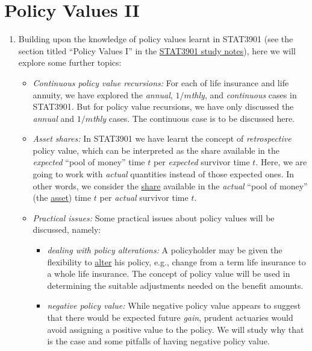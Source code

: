 \section{Policy Values II}
\label{sect:policy-values}
\begin{enumerate}
\item Building upon the knowledge of policy values learnt in STAT3901 (see the
section titled ``Policy Values I'' in the
\href{https://leochiukl.github.io/files/stat3901-study-notes.pdf}{STAT3901
study notes}), here we will explore some further topics:
\begin{itemize}
\item \emph{Continuous policy value recursions:} For each of life insurance and
life annuity, we have explored the \emph{annual}, \emph{\(1/m\)thly}, and
\emph{continuous} cases in STAT3901. But for policy value recursions, we have
only discussed the \emph{annual} and \emph{\(1/m\)thly} cases. The continuous
case is to be discussed here.

\item \emph{Asset shares:} In STAT3901 we have learnt the concept of
\emph{retrospective} policy value, which can be interpreted as the share
available in the \emph{expected} ``pool of money''  time \(t\) per
\emph{expected} survivor  time \(t\).  Here, we are going to work
with \emph{actual} quantities instead of those expected ones. In other words,
we consider the \underline{share} available in the \emph{actual} ``pool of
money'' (the \underline{asset})  time \(t\) per \emph{actual}
survivor  time \(t\).

\item \emph{Practical issues:} Some practical issues about policy values will
be discussed, namely:
\begin{itemize}
\item \emph{dealing with policy alterations:} A policyholder may be given the
flexibility to \underline{alter} his policy, e.g., change from a term life
insurance to a whole life insurance. The concept of policy value will be used
in determining the suitable adjustments needed on the benefit amounts.
\item \emph{negative policy value:} While negative policy value appears to
suggest that there would be expected future \emph{gain}, prudent actuaries
would avoid assigning a positive value to the policy. We will study why that is
the case and some pitfalls of having negative policy value.
\end{itemize}
\end{itemize}
\end{enumerate}
